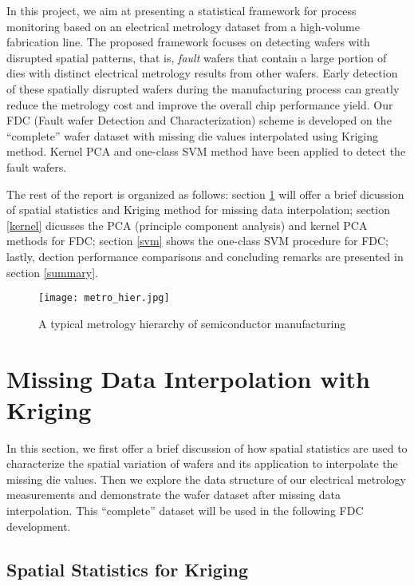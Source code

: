 \documentclass[english]{article}
\numberwithin{equation}{section}
\numberwithin{table}{section}
\numberwithin{figure}{section}
\begin{document}
In this project, we aim at presenting a statistical framework for 
process monitoring based on an electrical metrology dataset from a
high-volume fabrication line. The proposed framework focuses on 
detecting wafers with disrupted spatial patterns, that is,
\emph{fault} wafers that contain a large portion of dies with distinct
electrical metrology results from other wafers. Early detection of
these spatially disrupted wafers during the manufacturing process can
greatly reduce the metrology cost and improve the overall chip performance yield.
Our FDC (Fault wafer Detection and Characterization) scheme is developed on the
``complete'' wafer dataset with missing die values interpolated using Kriging
method\cite{Cressie93}. Kernel PCA and one-class SVM method have
been applied to detect the fault wafers.   


The rest of the report is organized as follows: section \ref{kriging}
will offer a brief dicussion of spatial statistics and Kriging method
for missing data interpolation; section \ref{kernel} dicusses the PCA
(principle component analysis) and kernel PCA methods for FDC; section
\ref{svm} shows the one-class SVM procedure for FDC; lastly, dection
performance comparisons and concluding remarks are presented in section \ref{summary}.

\begin{figure} \centering
  \texttt{[image: metro\_hier.jpg]}
  \caption{A typical metrology hierarchy of semiconductor manufacturing}
  \label{metro_hier}
\end{figure}


\section{Missing Data Interpolation with Kriging} \label{kriging}

\hspace{12 pt}
In this section, we first offer a brief discussion of how spatial
statistics are used to characterize the spatial variation of wafers
and its application to interpolate the missing die values. Then we
explore the data structure of our electrical metrology
measurements and demonstrate the wafer dataset after missing data
interpolation. This ``complete'' dataset will be used in the following
FDC development.  


\subsection{Spatial Statistics for Kriging} \label{spatial}
\end{document}
